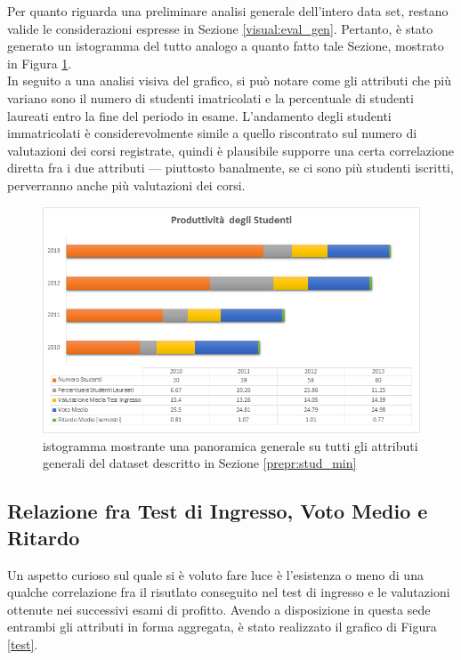     Per quanto riguarda una preliminare analisi generale dell'intero data set, restano valide le considerazioni espresse in Sezione \ref{visual:eval_gen}. Pertanto, è stato generato un istogramma del tutto analogo a quanto fatto tale Sezione, mostrato in Figura \ref{stud_gen}. \\

    In seguito a una analisi visiva del grafico, si può notare come gli attributi che più variano sono il numero di studenti imatricolati e la percentuale di studenti laureati entro la fine del periodo in esame. L'andamento degli studenti immatricolati è considerevolmente simile a quello riscontrato sul numero di valutazioni dei corsi registrate, quindi è plausibile supporre una certa correlazione diretta fra i due attributi --- piuttosto banalmente, se ci sono più studenti iscritti, perverranno anche più valutazioni dei corsi.

    \begin{figure}
        \centering
        \caption{istogramma mostrante una panoramica generale su tutti gli attributi generali del dataset descritto in Sezione \ref{prepr:stud_min}}
        \label{stud_gen}
        \includegraphics[scale=0.50]{../visual/stud_1.png}
    \end{figure}

    \subsection{Relazione fra Test di Ingresso, Voto Medio e Ritardo}

    Un aspetto curioso sul quale si è voluto fare luce è l'esistenza o meno di una qualche correlazione fra il risutlato conseguito nel test di ingresso e le valutazioni ottenute nei successivi esami di profitto. Avendo a disposizione in questa sede entrambi gli attributi in forma aggregata, è stato realizzato il grafico di Figura \ref{test}. \\

